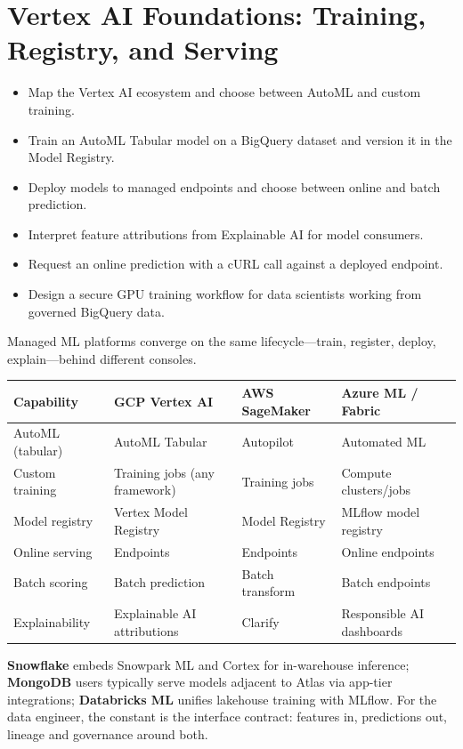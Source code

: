 \chapter{Vertex AI Foundations: Training, Registry, and Serving}

\begin{objectives}
\begin{itemize}
    \item Map the Vertex AI ecosystem and choose between AutoML and custom training.
    \item Train an AutoML Tabular model on a BigQuery dataset and version it in the Model Registry.
    \item Deploy models to managed endpoints and choose between online and batch prediction.
    \item Interpret feature attributions from Explainable AI for model consumers.
    \item Request an online prediction with a cURL call against a deployed endpoint.
    \item Design a secure GPU training workflow for data scientists working from governed BigQuery data.
\end{itemize}
\end{objectives}

\begin{crosscloud}
Managed ML platforms converge on the same lifecycle---train, register, deploy, explain---behind different consoles.

\vspace{2mm}
{\footnotesize
\begin{tabular}{@{}p{2.8cm}p{3.0cm}p{3.0cm}p{3.0cm}@{}} \\
\toprule
\textbf{Capability} & \textbf{GCP Vertex AI} & \textbf{AWS SageMaker} & \textbf{Azure ML / Fabric} \\
\midrule
AutoML (tabular) & AutoML Tabular & Autopilot & Automated ML \\
Custom training & Training jobs (any framework) & Training jobs & Compute clusters/jobs \\
Model registry & Vertex Model Registry & Model Registry & MLflow model registry \\
Online serving & Endpoints & Endpoints & Online endpoints \\
Batch scoring & Batch prediction & Batch transform & Batch endpoints \\
Explainability & Explainable AI attributions & Clarify & Responsible AI dashboards \\
\bottomrule
\end{tabular}}

\vspace{1mm}
\textbf{Snowflake} embeds Snowpark ML and Cortex for in-warehouse inference; \textbf{MongoDB} users typically serve models adjacent to Atlas via app-tier integrations; \textbf{Databricks ML} unifies lakehouse training with MLflow. For the data engineer, the constant is the interface contract: features in, predictions out, lineage and governance around both.
\end{crosscloud}

